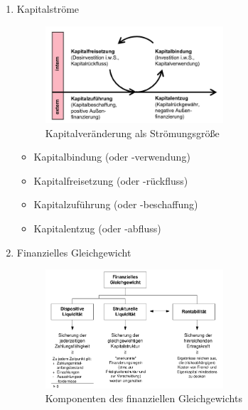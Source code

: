 \documentclass[11pt]{article}
\begin{document}
\begin{enumerate}
\item Kapitalströme
\label{sec:orgfa6f9f6}
\begin{figure}[htbp]
\centering
\includegraphics[width=250px]{./pictures/kapitalstroeme.png}
\caption{Kapitalveränderung als Strömungsgröße}
\end{figure} 
\begin{itemize}
\item Kapitalbindung (oder -verwendung)
\item Kapitalfreisetzung (oder -rückfluss)
\item Kapitalzuführung (oder -beschaffung)
\item Kapitalentzug (oder -abfluss)
\end{itemize}

\item Finanzielles Gleichgewicht
\label{sec:org4cd7195}
\begin{figure}[htbp]
\centering
\includegraphics[width=250px]{./pictures/finanzgg.png}
\caption{Komponenten des finanziellen Gleichgewichts}
\end{figure}
\end{enumerate}
\end{document}
